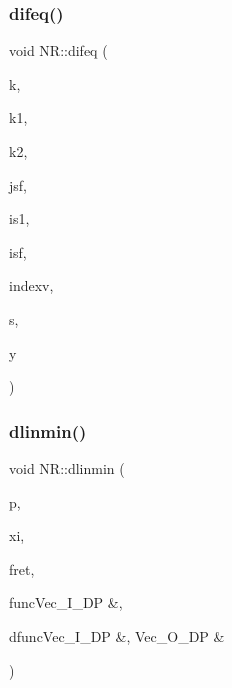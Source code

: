 \mbox{\label{namespaceNR_a7bed161b003de9971b9d0220074c406e}} 
\subsubsection{\texorpdfstring{difeq()}{difeq()}}
{\footnotesize\ttfamily void N\+R\+::difeq (\begin{DoxyParamCaption}\item[{const int}]{k,  }\item[{const int}]{k1,  }\item[{const int}]{k2,  }\item[{const int}]{jsf,  }\item[{const int}]{is1,  }\item[{const int}]{isf,  }\item[{\mbox{\hyperlink{namespaceNR_ae67ce7dc86a8a64a7ce73c3c030ff610}{Vec\+\_\+\+I\+\_\+\+I\+NT}} \&}]{indexv,  }\item[{\mbox{\hyperlink{namespaceNR_adc1f8da33094b6bbeb1f5f899515ce54}{Mat\+\_\+\+O\+\_\+\+DP}} \&}]{s,  }\item[{\mbox{\hyperlink{namespaceNR_a2b8abfda8fffad6ba0a1b5a4c0773dbf}{Mat\+\_\+\+I\+\_\+\+DP}} \&}]{y }\end{DoxyParamCaption})}

\mbox{\label{namespaceNR_adb5624ebdf74af474a3a644c2aa3d3e7}} 
\subsubsection{\texorpdfstring{dlinmin()}{dlinmin()}}
{\footnotesize\ttfamily void N\+R\+::dlinmin (\begin{DoxyParamCaption}\item[{\mbox{\hyperlink{namespaceNR_ab293e06a6bf799d8a7ed932b6852bcb8}{Vec\+\_\+\+I\+O\+\_\+\+DP}} \&}]{p,  }\item[{\mbox{\hyperlink{namespaceNR_ab293e06a6bf799d8a7ed932b6852bcb8}{Vec\+\_\+\+I\+O\+\_\+\+DP}} \&}]{xi,  }\item[{\mbox{\hyperlink{namespaceNR_af6ff762dd605ff477b8e52387253a02a}{DP}} \&}]{fret,  }\item[{\mbox{\hyperlink{namespaceNR_af6ff762dd605ff477b8e52387253a02a}{DP}} }]{funcVec\+\_\+\+I\+\_\+\+D\+P \&,  }\item[{void }]{dfuncVec\+\_\+\+I\+\_\+\+D\+P \&, Vec\+\_\+\+O\+\_\+\+D\+P \& }\end{DoxyParamCaption})}

